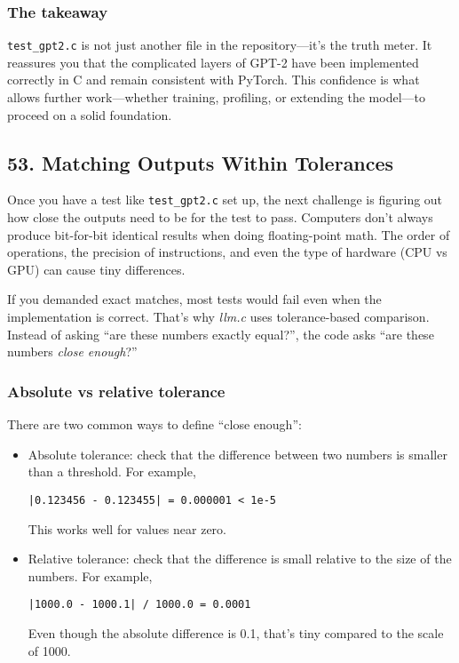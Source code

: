 \documentclass[
  letterpaper,
  DIV=11,
  numbers=noendperiod]{scrreprt}
\begin{document}
\subsubsection{The takeaway}\label{the-takeaway-41}

\texttt{test\_gpt2.c} is not just another file in the repository---it's
the truth meter. It reassures you that the complicated layers of GPT-2
have been implemented correctly in C and remain consistent with PyTorch.
This confidence is what allows further work---whether training,
profiling, or extending the model---to proceed on a solid foundation.

\subsection{53. Matching Outputs Within
Tolerances}\label{matching-outputs-within-tolerances}

Once you have a test like \texttt{test\_gpt2.c} set up, the next
challenge is figuring out how close the outputs need to be for the test
to pass. Computers don't always produce bit-for-bit identical results
when doing floating-point math. The order of operations, the precision
of instructions, and even the type of hardware (CPU vs GPU) can cause
tiny differences.

If you demanded exact matches, most tests would fail even when the
implementation is correct. That's why \emph{llm.c} uses tolerance-based
comparison. Instead of asking ``are these numbers exactly equal?'', the
code asks ``are these numbers \emph{close enough}?''

\subsubsection{Absolute vs relative
tolerance}\label{absolute-vs-relative-tolerance}

There are two common ways to define ``close enough'':

\begin{itemize}
\item
  Absolute tolerance: check that the difference between two numbers is
  smaller than a threshold. For example,

\begin{verbatim}
|0.123456 - 0.123455| = 0.000001 < 1e-5
\end{verbatim}

  This works well for values near zero.
\item
  Relative tolerance: check that the difference is small relative to the
  size of the numbers. For example,

\begin{verbatim}
|1000.0 - 1000.1| / 1000.0 = 0.0001
\end{verbatim}

  Even though the absolute difference is 0.1, that's tiny compared to
  the scale of 1000.
\end{itemize}
\end{document}
